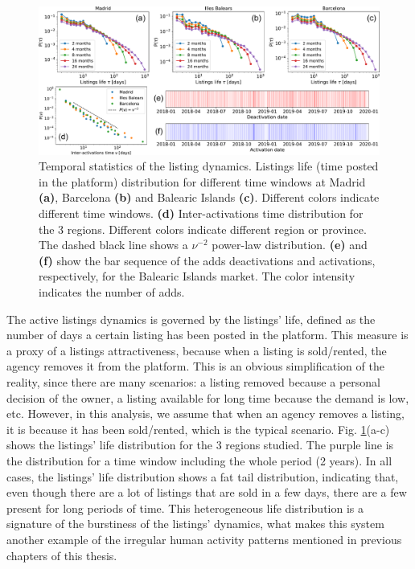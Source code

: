 \begin{figure}
    \centering
    \includegraphics[width =\textwidth]{Figs/Idealista_dynamics/panel_time.pdf}
	\caption[Temporal statistics of the listing dynamics.]{ \label{fig:panel_time} Temporal statistics of the listing dynamics. Listings life (time posted in the platform) distribution for different time windows at Madrid \textbf{(a)}, Barcelona \textbf{(b)} and Balearic Islands \textbf{(c)}. Different colors indicate different time windows. \textbf{(d)} Inter-activations time distribution for the 3 regions. Different colors indicate different region or province. The dashed black line shows a $\nu^{-2}$ power-law distribution. \textbf{(e)} and \textbf{(f)} show the bar sequence of the adds deactivations and activations, respectively, for the Balearic Islands market. The color intensity indicates the number of adds.}
\end{figure}

The active listings dynamics is governed by the listings' life, defined as the number of days a certain listing has been posted in the platform. This measure is a proxy of a listings attractiveness, because when a listing is sold/rented, the agency removes it from the platform. This is an obvious simplification of the reality, since there are many scenarios: a listing removed because a personal decision of the owner, a listing available for long time because the demand is low, etc. However, in this analysis, we assume that when an agency removes a listing, it is because it has been sold/rented, which is the typical scenario. Fig. \ref{fig:panel_time}(a-c) shows the listings' life distribution for the 3 regions studied. The purple line is the distribution for a time window including the whole period (2 years). In all cases, the listings' life distribution shows a fat tail distribution, indicating that, even though there are a lot of listings that are sold in a few days, there are a few present for long periods of time. This heterogeneous life distribution is a signature of the burstiness of the listings' dynamics, what makes this system another example of the irregular human activity patterns mentioned in previous chapters of this thesis.

